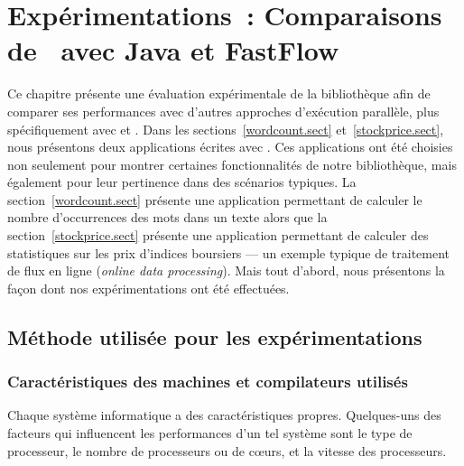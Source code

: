 
\chapter{Exp\'erimentations~: Comparaisons de \ppff\ avec Java et FastFlow}
\label{experiences.chap}

Ce chapitre pr\'esente une \'evaluation exp\'erimentale de la biblioth\`eque  afin de comparer ses performances avec d'autres approches d'ex\'ecution parall\`ele, plus sp\'ecifiquement avec  et .
%
Dans les sections~\ref{wordcount.sect} et~\ref{stockprice.sect}, nous pr\'esentons deux applications \'ecrites avec \PpFf. Ces applications ont \'et\'e choisies non seulement pour montrer certaines fonctionnalit\'es de notre biblioth\`eque, mais \'egalement pour leur pertinence dans des sc\'enarios typiques. La section~\ref{wordcount.sect} pr\'esente une application permettant de calculer le nombre d'occurrences des mots dans un texte %
%
alors que la section~\ref{stockprice.sect} pr\'esente une application permettant de calculer des statistiques sur les prix d'indices boursiers --- un exemple typique de traitement de flux en ligne (\emph{online data processing}). Mais tout d'abord, nous pr\'esentons la fa\c{c}on dont nos exp\'erimentations ont \'et\'e effectu\'ees.




\section{M\'ethode utilis\'ee pour les exp\'erimentations}
\label{usedMethodsForBenchmarks.chap}

\subsection{Caractéristiques des machines et compilateurs utilisés}

Chaque syst\`eme informatique a des caract\'eristiques propres. Quelques-uns des facteurs qui influencent les performances d'un tel syst\`eme sont le type de processeur, le nombre de processeurs ou de c\oe{}urs, et la vitesse des processeurs. 


